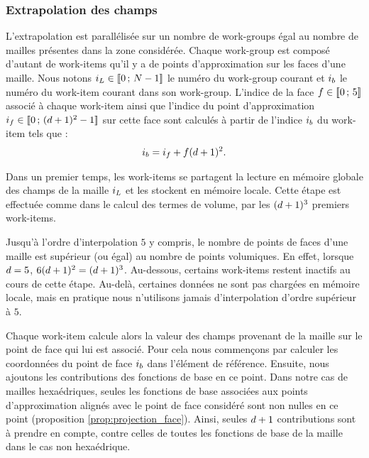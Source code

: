 \subsubsection{Extrapolation des champs}
\label{sssect:kernel_surface_extraction}

L'extrapolation est parallélisée sur un nombre de work-groups égal au nombre de mailles
présentes dans la zone considérée. Chaque work-group est composé d'autant de
work-items qu'il y a de points d'approximation sur les faces d'une maille.
Nous notons $i_{L} \in \lbrack\!\lbrack0\,;\,N - 1\rbrack\!\rbrack$ le numéro du
work-group courant et $i_b$ le numéro du work-item courant dans son work-group. L'indice de la face $f \in \lbrack\!\lbrack0\,;\,5\rbrack\!\rbrack$ associé à chaque
work-item ainsi que l'indice du point d'approximation $i_f \in \lbrack\!\lbrack0\,;\,(d + 1)^2 - 1\rbrack\!\rbrack$
sur cette face sont calculés à partir de l’indice $i_b$ du work-item tels que :
\begin{align} \label{eq:kernel_decomp_face_id}
	i_b = i_f + f (d + 1)^2 .
\end{align}

Dans un premier temps, les work-items se partagent la lecture en mémoire
globale des champs de la maille
$i_{L}$ et les stockent en mémoire locale.
Cette étape est effectuée comme
dans le calcul des termes de volume, par les
$(d + 1)^3$ premiers work-items.

\begin{remark} \label{rq:kernel_flux_delta_pg_1}
	Jusqu'à l'ordre d'interpolation $5$ y compris,
	le nombre de points de faces d'une maille est supérieur (ou égal)
	au nombre de points volumiques. En effet, lorsque $d=5$,
	$6 (d + 1)^2 = (d + 1)^3$. Au-dessous, certains work-items restent
	inactifs au cours de cette étape. Au-delà, certaines données
	ne sont pas chargées en mémoire locale, mais en pratique nous
	n'utilisons jamais d'interpolation d'ordre supérieur à $5$.
\end{remark}

Chaque work-item calcule alors la valeur des champs provenant de la maille
sur le point de face qui lui est associé.
Pour cela nous commençons par calculer les coordonnées du point de face $i_b$ dans
l’élément de référence. Ensuite, nous ajoutons les contributions des fonctions de base
en ce point.
Dans notre cas de mailles hexaédriques, seules les fonctions de base associées aux points
d'approximation alignés avec le point de face considéré sont non nulles en ce point
(proposition \ref{prop:projection_face}). Ainsi, seules $d + 1$ contributions
sont à prendre en compte, contre celles de toutes les fonctions
de base de la maille dans le cas non hexaédrique.

